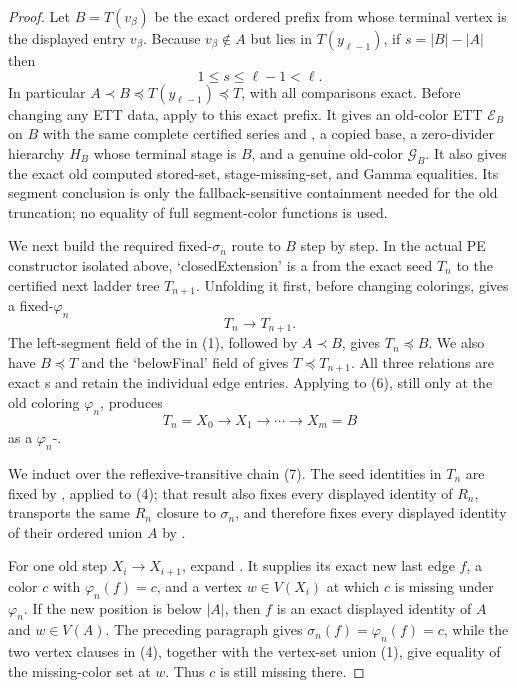 \begin{proof}
Let $B=T(v_\beta)$ be the exact ordered prefix from
 whose terminal vertex is the displayed entry
$v_\beta$.  Because $v_\beta\notin A$ but lies in
$T(y_{\ell-1})$, if $s=|B|-|A|$ then
\[
                         1\leq s\leq\ell-1<\ell.               \tag{5}
\]
In particular $A\prec B\preccurlyeq T(y_{\ell-1})\preccurlyeq T$, with
all comparisons exact.  Before changing any ETT data,
apply  to this exact prefix.
It gives an old-color ETT $\mathcal E_B$ on $B$ with the same complete
certified series and , a copied base, a
zero-divider hierarchy $H_B$ whose terminal stage is $B$, and a genuine
old-color  $\mathcal G_B$.  It also gives the exact
old computed stored-set, stage-missing-set, and Gamma equalities.  Its
segment conclusion is only the fallback-sensitive containment needed for
the old truncation; no equality of full segment-color functions is used.

We next build the required fixed-$\sigma_n$ route to $B$ step by step.  In
the actual PE constructor isolated above, `closedExtension' is a
 from the exact seed $T_n$ to the certified next
ladder tree $T_{n+1}$.  Unfolding it first, before changing colorings, gives
a fixed-$\varphi_n$ 
\[
                              T_n\longrightarrow T_{n+1}.       \tag{6}
\]
The left-segment field of the  in (1), followed
by $A\prec B$, gives $T_n\preccurlyeq B$.  We also have
$B\preccurlyeq T$ and the `belowFinal' field of
 gives $T\preccurlyeq T_{n+1}$.  All three
relations are exact s and retain the
individual edge entries.  Applying
 to (6), still only at the
old coloring $\varphi_n$, produces
\[
             T_n=X_0\longrightarrow X_1\longrightarrow\cdots
                 \longrightarrow X_m=B                         \tag{7}
\]
as a $\varphi_n$-.

We induct over the reflexive-transitive chain (7).  The seed identities in
$T_n$ are fixed by , applied to
(4); that result also fixes every displayed identity of $R_n$, transports
the same $R_n$ closure to $\sigma_n$, and therefore fixes every displayed
identity of their ordered union $A$ by .

For one old step $X_i\longrightarrow X_{i+1}$, expand
.  It supplies its exact new last edge $f$,
a color $c$ with $\varphi_n(f)=c$, and a vertex $w\in V(X_i)$ at which $c$
is missing under $\varphi_n$.  If the new position is below $|A|$, then
$f$ is an exact displayed identity of $A$ and $w\in V(A)$.  The preceding
paragraph gives $\sigma_n(f)=\varphi_n(f)=c$, while the two vertex clauses
in (4), together with the vertex-set union (1), give equality of the
missing-color set at $w$.  Thus $c$ is still missing there.


\end{proof}
